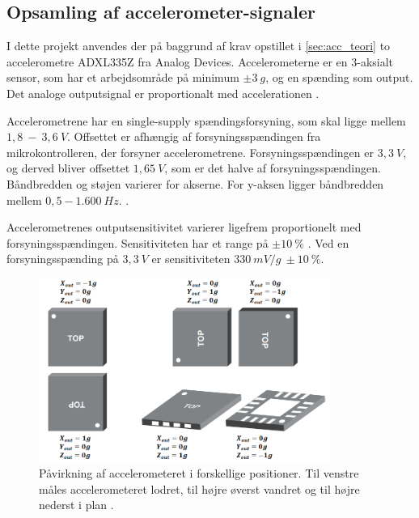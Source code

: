 \subsection{Opsamling af accelerometer-signaler}\label{sec:acc_imp}

I dette projekt anvendes der på baggrund af krav opstillet i \autoref{sec:acc_teori} to accelerometre ADXL335Z fra Analog Devices. Accelerometerne er en 3-aksialt sensor, som har et arbejdsområde på minimum $\pm3~g$, og en spænding som output. Det analoge outputsignal er proportionalt med accelerationen \citep{analogdevices2009}. 

Accelerometrene har en single-supply spændingsforsyning, som skal ligge mellem $1,8~-~3,6~V$.  Offsettet er afhængig af forsyningsspændingen fra mikrokontrolleren, der forsyner accelerometrene. Forsyningsspændingen er $3,3~V$, og derved bliver offsettet $1,65~V$, som er det halve af forsyningsspændingen. Båndbredden og støjen varierer for akserne. For y-aksen ligger båndbredden mellem $0,5 - 1.600~Hz$. \citep{analogdevices2010}.

Accelerometrenes outputsensitivitet varierer ligefrem proportionelt med forsyningsspændingen. Sensitiviteten har et range på $\pm10~\%$ \citep{analogdevices2010}. Ved en forsyningsspænding på $3,3~V$ er sensitiviteten $330~mV/g~\pm 10~\%$. 

\begin{figure}[H]
\centering
\includegraphics[width=0.85\textwidth]{figures/acc_paavirkning}
\caption{Påvirkning af accelerometeret i forskellige positioner. Til venstre måles accelerometeret lodret, til højre øverst vandret og til højre nederst i plan \citep{analogdevices2010}.}
\label{fig:acc}
\end{figure}

